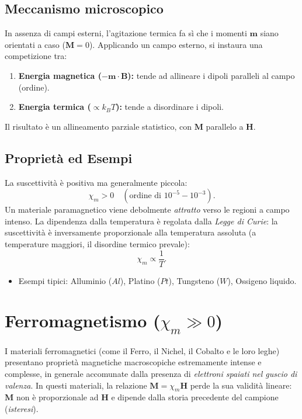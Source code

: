 \documentclass[a4paper,11pt]{report}
\begin{document}
\subsection{Meccanismo microscopico}
In assenza di campi esterni, l'agitazione termica fa sì che i momenti $\bm{m}$ siano orientati a caso ($\bm{M}=0$).
Applicando un campo esterno, si instaura una competizione tra:
\begin{enumerate}
    \item \textbf{Energia magnetica ($-\bm{m} \cdot \bm{B}$):} tende ad allineare i dipoli paralleli al campo (ordine).
    \item \textbf{Energia termica ($\propto k_B T$):} tende a disordinare i dipoli.
\end{enumerate}
Il risultato è un allineamento parziale statistico, con $\bm{M}$ parallelo a $\bm{H}$.

\subsection{Proprietà ed Esempi}
La suscettività è positiva ma generalmente piccola:
\begin{equation}
    \chi_m > 0 \quad (\text{ordine di } 10^{-5} - 10^{-3}).
\end{equation}
Un materiale paramagnetico viene debolmente \textit{attratto} verso le regioni a campo intenso.
La dipendenza dalla temperatura è regolata dalla \textit{Legge di Curie}: la suscettività è inversamente proporzionale alla temperatura assoluta (a temperature maggiori, il disordine termico prevale):
\begin{equation}
    \chi_m \propto \frac{1}{T}.
\end{equation}
\begin{itemize}
    \item {Esempi tipici:} Alluminio ($Al$), Platino ($Pt$), Tungsteno ($W$), Ossigeno liquido.
\end{itemize}

\section{Ferromagnetismo (\texorpdfstring{$\chi_m \gg 0$}{chi >> 0})}

I materiali ferromagnetici (come il Ferro, il Nichel, il Cobalto e le loro leghe) presentano proprietà magnetiche macroscopiche estremamente intense e complesse, in generale accomunate dalla presenza di \textit{elettroni spaiati nel guscio di valenza}. In questi materiali, la relazione $\bm{M} = \chi_m \bm{H}$ perde la sua validità lineare: $\bm{M}$ non è proporzionale ad $\bm{H}$ e dipende dalla storia precedente del campione (\textit{isteresi}).
\end{document}
